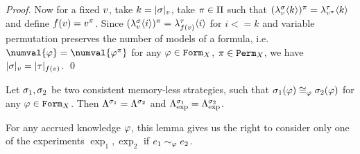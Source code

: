 \begin{proof}
Now for a fixed $v$, take $k = |\sigma|_{v}$, take
  $\pi\in\Pi$ such that
  $(\lambda^{\sigma}_{v}\langle k\rangle)^\pi = \lambda^{\tau}_{v^\pi}\langle k\rangle$
  and define $f(v) = v^\pi$.
Since
 $(\lambda^{\sigma}_{v}\langle i\rangle)^\pi = \lambda^{\tau}_{f(v)}\langle i\rangle$
 for $i <= k$
 and variable permutation preserves the number of models of a formula, i.e.
  $\numval{\form} = \numval{\form^\perm}$ for any
  $\varphi\in\mathtt{Form}_X$, $\pi\in\mathtt{Perm}_X$,
 we have
  $|\sigma|_{v} = |\tau|_{f(v)}$.
  \qed
\end{proof}

\begin{corollary}
Let $\sigma_1, \sigma_2$ be two consistent memory-less strategies, such that
  $\sigma_1(\varphi) \cong_{\varphi} \sigma_2(\varphi)$ for any $\varphi\in\mathtt{Form}_X$.
Then $\Lambda^{\sigma_1} = \Lambda^{\sigma_2}$
  and $\Lambda^{\sigma_1}_\textrm{exp} = \Lambda^{\sigma_2}_\textrm{exp}$.
\end{corollary}

For any accrued knowledge $\varphi$, this lemma gives us the right
to consider only one of the experiments
$\exp_1, \exp_2$ if $e_1 \sim_\varphi e_2$.

